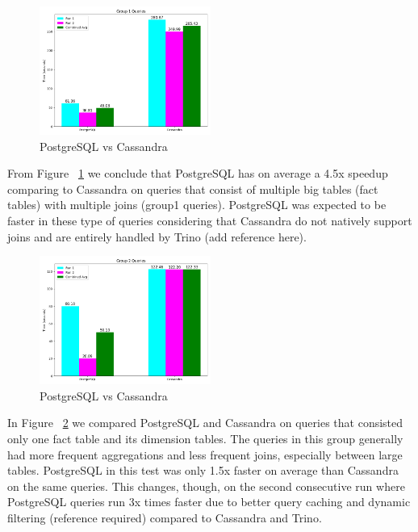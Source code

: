 \documentclass[conference]{IEEEtran}
\begin{document}
\begin{figure}[h]
	\centering
	\includegraphics[width=0.5\textwidth]{images/DBs_bench_no_distro/group1.png}
	\caption{PostgreSQL vs Cassandra}
	\label{fig:psql-cass-group1}
\end{figure}

From Figure ~\ref{fig:psql-cass-group1} we conclude that PostgreSQL has on average a 4.5x speedup comparing to Cassandra on queries that consist of multiple big tables (fact tables) with multiple joins (group1 queries). PostgreSQL was expected to be faster in these type of queries considering that Cassandra do not natively support joins and are entirely handled by Trino (add reference here).

\begin{figure}[h]
	\centering
	\includegraphics[width=0.5\textwidth]{images/DBs_bench_no_distro/group2.png}
	\caption{PostgreSQL vs Cassandra}
	\label{fig:psql-cass-group2}
\end{figure}

In Figure ~\ref{fig:psql-cass-group2} we compared PostgreSQL and Cassandra on queries that consisted only one fact table and its dimension tables. The queries in this group generally had more frequent aggregations and less frequent joins, especially between large tables. PostgreSQL in this test was only 1.5x faster on average than Cassandra on the same queries. This changes, though, on the second consecutive run where PostgreSQL queries run 3x times faster due to better query caching and dynamic filtering (reference required) compared to Cassandra and Trino.
\end{document}
